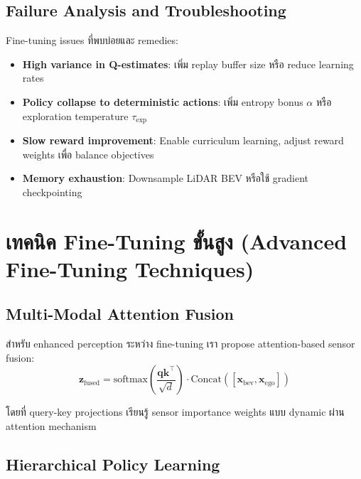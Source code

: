 \documentclass[10pt,a4paper,twocolumn]{article}
\begin{document}
\subsection{Failure Analysis and Troubleshooting}

Fine-tuning issues ที่พบบ่อยและ remedies:
\begin{itemize}
    \item \textbf{High variance in Q-estimates}: เพิ่ม replay buffer size หรือ reduce learning rates
    
    \item \textbf{Policy collapse to deterministic actions}: เพิ่ม entropy bonus $\alpha$ หรือ exploration temperature $\tau_{\text{exp}}$
    
    \item \textbf{Slow reward improvement}: Enable curriculum learning, adjust reward weights เพื่อ balance objectives
    
    \item \textbf{Memory exhaustion}: Downsample LiDAR BEV หรือใช้ gradient checkpointing
\end{itemize}

\section{เทคนิค Fine-Tuning ขั้นสูง (Advanced Fine-Tuning Techniques)}

\subsection{Multi-Modal Attention Fusion}

สำหรับ enhanced perception ระหว่าง fine-tuning เรา propose attention-based sensor fusion:
\begin{equation}\label{eq:attention-fusion}
    \mathbf{z}_{\text{fused}} = \text{softmax}\left(\frac{\mathbf{q}\mathbf{k}^{\top}}{\sqrt{d}}\right)\cdot \text{Concat}([\mathbf{x}_{\text{bev}}, \mathbf{x}_{\text{ego}}])
\end{equation}

โดยที่ query-key projections เรียนรู้ sensor importance weights แบบ dynamic ผ่าน attention mechanism

\subsection{Hierarchical Policy Learning}
\end{document}
